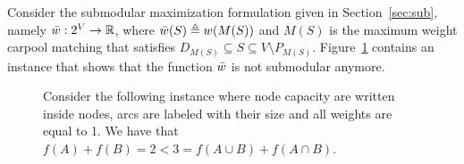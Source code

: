 
Consider the submodular maximization formulation given in
Section~\ref{sec:sub}, namely $\bar{w}: 2^V \to \mathbb{R}$, where
$\bar{w}(S) \triangleq w(M(S))$ and $M(S)$ is the maximum weight carpool
matching that satisfies $D_{M(S)} \subseteq S \subseteq V \setminus
P_{M(S)}$.
%
Figure~\ref{fig:not submodular} contains an instance that shows that
the function $\bar{w}$ is not submodular anymore.

\begin{figure}
\begin{center}

\end{center}
\caption{Consider the following instance where node capacity are
written inside nodes, arcs are labeled with their size and all weights
are equal to 1.  We have that $f(A) + f(B) = 2 < 3 = f(A \cup B) +
f(A \cap B)$.}
\label{fig:not submodular}
\end{figure}
